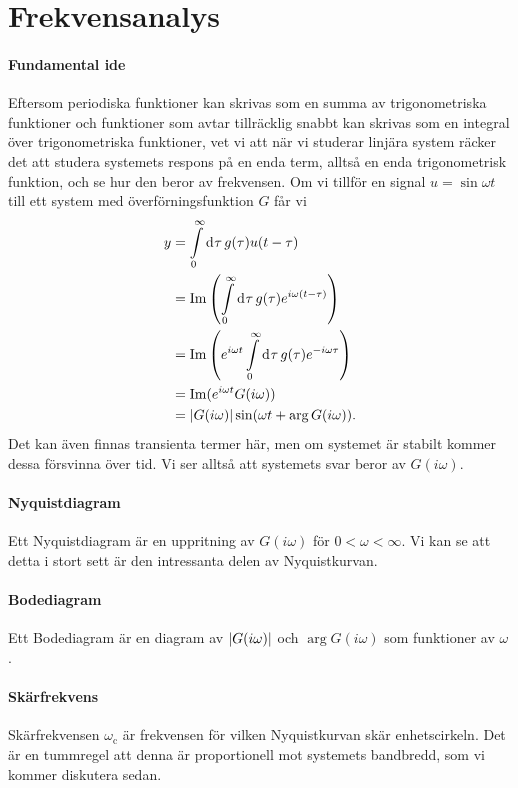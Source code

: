 \section{Frekvensanalys}

\paragraph{Fundamental ide}
Eftersom periodiska funktioner kan skrivas som en summa av trigonometriska funktioner och funktioner som avtar tillräcklig snabbt kan skrivas som en integral över trigonometriska funktioner, vet vi att när vi studerar linjära system räcker det att studera systemets respons på en enda term, alltså en enda trigonometrisk funktion, och se hur den beror av frekvensen. Om vi tillför en signal $u = \sin{\omega t}$ till ett system med överförningsfunktion $G$ får vi
\begin{align*}
	y &= \int\limits_{0}^{\infty}\dd[]{\tau}g(\tau)u(t - \tau) \\
	  &= \Im\left(\int\limits_{0}^{\infty}\dd[]{\tau}g(\tau)e^{i\omega(t - \tau)}\right) \\
	  &= \Im\left(e^{i\omega t}\int\limits_{0}^{\infty}\dd[]{\tau}g(\tau)e^{-i\omega\tau}\right) \\
	  &= \Im(e^{i\omega t}G(i\omega)) \\
	  &= \abs{G(i\omega)}\sin(\omega t + \arg{G(i\omega)}).
\end{align*}
Det kan även finnas transienta termer här, men om systemet är stabilt kommer dessa försvinna över tid. Vi ser alltså att systemets svar beror av $G(i\omega)$.

\paragraph{Nyquistdiagram}
Ett Nyquistdiagram är en uppritning av $G(i\omega)$ för $0 < \omega < \infty$. Vi kan se att detta i stort sett är den intressanta delen av Nyquistkurvan.

\paragraph{Bodediagram}
Ett Bodediagram är en diagram av $\abs{G(i\omega)}$ och $\arg{G(i\omega)}$ som funktioner av $\omega$.

\paragraph{Skärfrekvens}
Skärfrekvensen $\omega_{\text{c}}$ är frekvensen för vilken Nyquistkurvan skär enhetscirkeln. Det är en tummregel att denna är proportionell mot systemets bandbredd, som vi kommer diskutera sedan.

